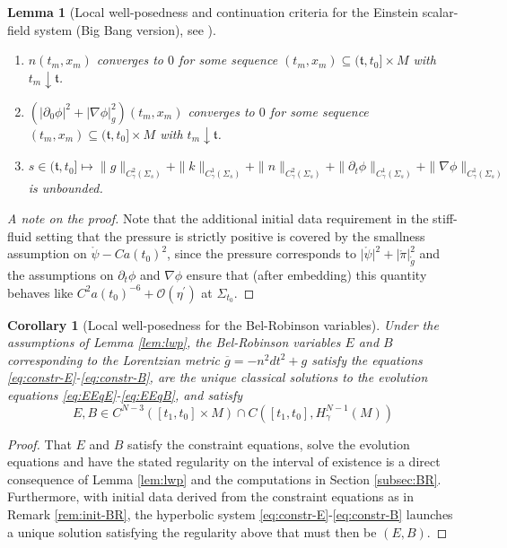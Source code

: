 \documentclass[11pt,leqno,textwidth=10cm]{amsart}
\numberwithin{equation}{section}
\theoremstyle{definition}
\theoremstyle{plain}
\newtheorem{lemma}[definition]{Lemma}
\newtheorem{corollary}[definition]{Corollary}
\newcommand{\1}{\mathbbm{1}}
\newcommand{\g}{\overline{g}}
\renewcommand{\O}[1]{\mathcal{O}\left(#1\right)}
\newcommand{\del}{\partial}
\begin{document}
\begin{lemma}[Local well-posedness and continuation criteria for the Einstein scalar-field system (Big Bang version), see {\cite[Theorem 14.1]{Rodnianski2014}}]
\begin{enumerate}
\item $n(t_m,x_m)$ converges to $0$ for some sequence $(t_m,x_m)\subseteq (\mathfrak{t},t_0]\times M$ with $t_m\downarrow \mathfrak{t}$.
\item $\left(\lvert\del_0\phi\rvert^2+\lvert\nabla\phi\rvert_g^2\right)(t_m,x_m)$ converges to $0$ for some sequence $(t_m,x_m)\subseteq (\mathfrak{t},t_0]\times M$ with $t_m\downarrow \mathfrak{t}$.
\item $s\in(\mathfrak{t},t_0]\mapsto\|g\|_{C^2_\gamma(\Sigma_s)}+\|k\|_{C^1_\gamma(\Sigma_s)}+\|n\|_{C^2_\gamma(\Sigma_s)}+\|\del_t\phi\|_{C^1_\gamma(\Sigma_s)}+\|\nabla\phi\|_{C^1_\gamma(\Sigma_s)}$ is unbounded.
\end{enumerate}
\end{lemma}
\begin{proof}[A note on the proof]
Note that the additional initial data requirement in the stiff-fluid setting that the pressure is strictly positive is covered by the smallness assumption on $\mathring{\psi}-Ca(t_0)^2$, since the pressure corresponds to $\lvert\mathring{\psi}\rvert^2+\lvert\mathring{\pi}\rvert_{\mathring{g}}^2$ and the assumptions on $\del_t\phi$ and $\nabla\phi$ ensure that (after embedding) this quantity behaves like $C^2a(t_0)^{-6}+\O{\eta^\prime}$ at $\Sigma_{t_0}$.
\end{proof}
\begin{corollary}[Local well-posedness for the Bel-Robinson variables]\label{cor:lwp-BR}
Under the assumptions of Lemma \ref{lem:lwp}, the Bel-Robinson variables $E$ and $B$ corresponding to the Lorentzian metric $\g=-n^2dt^2+g$ satisfy the equations \eqref{eq:constr-E}-\eqref{eq:constr-B}, are the unique classical solutions to the evolution equations \eqref{eq:EEqE}-\eqref{eq:EEqB}, and satisfy
\[E,B\in C^{N-3}([t_1,t_0]\times M)\cap C([t_1,t_0], H^{N-1}_\gamma(M))\]
\end{corollary}
\begin{proof}
That $E$ and $B$ satisfy the constraint equations, solve the evolution equations and have the stated regularity on the interval of existence is a direct consequence of Lemma \ref{lem:lwp} and the computations in Section \ref{subsec:BR}. Furthermore, with initial data derived from the constraint equations as in Remark \ref{rem:init-BR}, the hyperbolic system \eqref{eq:constr-E}-\eqref{eq:constr-B} launches a unique solution satisfying the regularity above that must then be $(E,B)$.
\end{proof}
\end{document}
